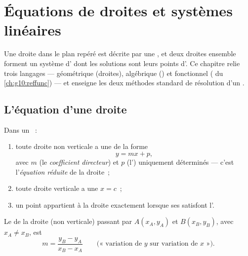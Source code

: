 \chapter{Équations de droites et systèmes linéaires}\label{ch:g10:lines}

Une droite dans le plan repéré est décrite par une , et deux
droites ensemble forment un système d' dont les solutions sont
leurs points d'. Ce chapitre relie trois langages ---
géométrique (droites), algébrique () et fonctionnel ( du \cref{ch:g10:reffunc}) --- et enseigne les deux méthodes
standard de résolution d'un .

\section{L'équation d'une droite}

\begin{theorem}\label{thm:g10:lines:reduced}
Dans un ~:
\begin{enumerate}
  \item toute droite non verticale a une  de la forme
        \[
        y = mx + p ,
        \]
        avec $m$ (le \emph{coefficient directeur}) et $p$ (l'\emph{}) uniquement
        déterminés --- c'est l'\emph{équation réduite} de la droite~;
  \item toute droite verticale a une  $x = c$~;
  \item un point appartient à la droite exactement lorsque ses
         satisfont l'.
\end{enumerate}
\end{theorem}
\admitted

\begin{proposition}\label{prop:g10:lines:slope}
Le  de la droite (non verticale) passant par
$A(x_A, y_A)$ et $B(x_B, y_B)$, avec $x_A \neq x_B$, est
\[
m = \frac{y_B - y_A}{x_B - x_A}
\qquad
\text{(«~variation de $y$ sur variation de $x$~»).}
\]
\end{proposition}

